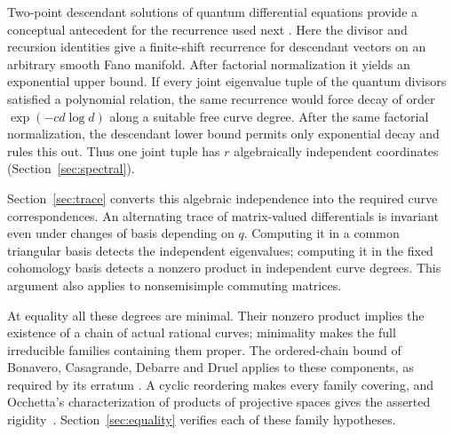 Two-point descendant solutions of quantum differential equations
provide a conceptual antecedent for the recurrence used next
\cite[\S6]{Givental1996}.
Here the divisor and recursion identities give a finite-shift
recurrence for descendant vectors on an arbitrary smooth Fano manifold.
After factorial normalization it yields an
exponential upper bound. If every joint eigenvalue tuple of the quantum
divisors satisfied a polynomial relation, the same recurrence would
force decay of order $\exp(-c d\log d)$ along a suitable free curve
degree. After the same factorial normalization, the descendant lower
bound permits only exponential decay and rules this out. Thus one joint
tuple has $r$ algebraically independent coordinates
(Section~\ref{sec:spectral}).

Section~\ref{sec:trace} converts this algebraic independence into the
required curve correspondences. An alternating trace of matrix-valued
differentials is invariant even under changes of basis depending on
$q$. Computing it in a common triangular basis detects the independent
eigenvalues; computing it in the fixed cohomology basis detects a
nonzero product in independent curve degrees. This argument also
applies to nonsemisimple commuting matrices.

At equality all these degrees are minimal. Their nonzero product
implies the existence of a chain of actual rational curves; minimality
makes the full irreducible families containing them proper.
The ordered-chain bound of Bonavero, Casagrande, Debarre and Druel
applies to these components, as required by its erratum
\cite{BCDDErratum}. A cyclic reordering makes every family covering,
and Occhetta's characterization of products of projective spaces gives
the asserted rigidity~\cite{Occhetta2006}.
Section~\ref{sec:equality} verifies each of these family hypotheses.
